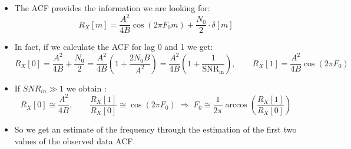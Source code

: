 \begin{itemize}
\begin{align*}
&= \frac{A^{2}}{4B} \cos(2\pi F_{0} m)
   + \frac{1}{2B}\, N_{0} B\,
     \operatorname{sinc}\left(2B \frac{m}{2B}\right) \\[4pt]
&= \frac{A^{2}}{4B} \cos(2\pi F_{0} m)
   + \frac{N_{0}}{2}\, \delta[m] .
\end{align*}
    \item The ACF provides the information we are looking for:
    \[
    R_X[m]=\frac{A^2}{4B}\cos(2\pi F_0m)+\frac{N_0}{2}\cdot\delta[m]
    \]
    \item In fact, if we calculate the ACF for lag 0 and 1 we get:
    \[
R_X[0]
= \frac{A^{2}}{4B} + \frac{N_0}{2}
= \frac{A^{2}}{4B}\left(1 + \frac{2N_{0}B}{A^{2}}\right)
= \frac{A^{2}}{4B}\left(1 + \frac{1}{\mathrm{SNR}_{\mathrm{in}}}\right),
\qquad
R_X[1] = \frac{A^{2}}{4B}\cos(2\pi F_0)
\]
    \item If \(SNR_{in}\gg 1\) we obtain :
    \[
R_X[0] \cong \frac{A^{2}}{4B}, \qquad
\frac{R_X[1]}{R_X[0]} \cong \cos(2\pi F_0)
\;\Rightarrow\;
F_0 \cong \frac{1}{2\pi}\arccos\!\left(\frac{R_X[1]}{R_X[0]}\right)
\]
    \item So we get an estimate of the frequency through the estimation of the first two values of the observed data ACF.


\end{itemize}
